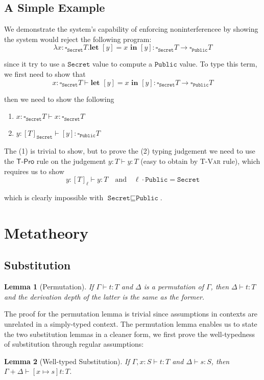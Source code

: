 \documentclass[conference]{IEEEtran}
\newcommand\lam[2]{\lambda #1.#2}
\newcommand\gradedt[2]{\square_#1 #2}
\newcommand\public{\texttt{Public}}
\newcommand\secret{\texttt{Secret}}
\newtheorem{lemma}{Lemma}
\begin{document}
\subsection{A Simple Example}

We demonstrate the system's capability of enforcing noninterferencee by showing the system would reject the following program:
$$
\lam{x:\gradedt{\secret}{T}}{\textbf{let }[y]=x\textbf{ in }[y]}:\gradedt{\secret}{T}\to\gradedt{\public}{T}
$$

since it try to use a $\secret$ value to compute a $\public$ value. To type this term, we first need to show that
$$
x:\gradedt{\secret}{T}\vdash \textbf{let }[y]=x\textbf{ in }[y]:\gradedt{\secret}{T}\to\gradedt{\public}{T}
$$

then we need to show the following
\begin{enumerate}
	\item $x:\gradedt{\secret}{T}\vdash x:\gradedt{\secret}{T}$ 
	\item $y:[T]_\secret\vdash [y]:\gradedt{\public}{T}$
\end{enumerate}

The (1) is trivial to show, but to prove the (2) typing judgement we need to use the $\textsf{T-Pro}$ rule on the judgement $y:T\vdash y:T$ (easy to obtain by \textsc{T-Var} rule), which requires us to show
$$
y:[T]_\ell\vdash y:T\quad\text{and}\quad \ell\cdot\texttt{Public}=\texttt{Secret}
$$

which is clearly impossible with $\texttt{Secret}\sqsubseteq\texttt{Public}$.

\section{Metatheory}
\subsection{Substitution}
\label{lem-perm}
\begin{lemma}[Permutation]
	If $\Gamma\vdash t:T$ and $\Delta$ is a permutation of $\Gamma$, then $\Delta\vdash t:T$ and the derivation depth of the latter is the same as the former.
\end{lemma}
The proof for the permutation lemma is trivial since assumptions in contexts are unrelated in a simply-typed context. The permutation lemma enables us to state the two substitution lemmas in a cleaner form, we first prove the well-typedness of substitution through regular assumptions:
\begin{lemma}[Well-typed Substitution] 
	If $\Gamma,x:S\vdash t:T$ and $\Delta\vdash s:S$, then $\Gamma+\Delta\vdash [x\mapsto s]t:T$.
\end{lemma}
\end{document}
